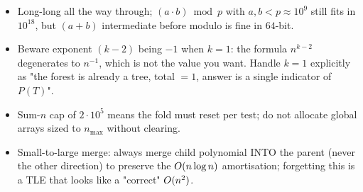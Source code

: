 \begin{hardeningbox}
\begin{itemize}[nosep,leftmargin=1.4em]
\item Long-long all the way through; \((a\cdot b)\bmod p\) with \(a,b < p
      \approx 10^9\) still fits in \(10^{18}\), but \((a+b)\) intermediate
      before modulo is fine in \(64\)-bit.
\item Beware exponent \((k-2)\) being \(-1\) when \(k=1\): the formula
      \(n^{k-2}\) degenerates to \(n^{-1}\), which is not the value you
      want.  Handle \(k=1\) explicitly as "the forest is already a tree,
      total \(=1\), answer is a single indicator of \(P(T)\)".
\item Sum-\(n\) cap of \(2\cdot 10^5\) means the fold must reset per test;
      do not allocate global arrays sized to \(n_{\max}\) without clearing.
\item Small-to-large merge: always merge child polynomial INTO the parent
      (never the other direction) to preserve the \(O(n\log n)\)
      amortisation; forgetting this is a TLE that looks like a "correct"
      \(O(n^2)\).
\end{itemize}
\end{hardeningbox}

\begin{recallbox}
\end{recallbox}
